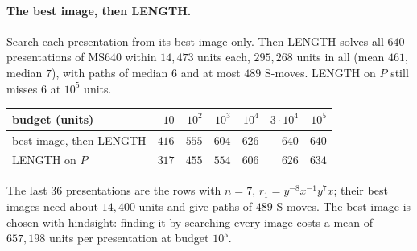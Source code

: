 \paragraph{The best image, then LENGTH.} Search each presentation from its best image only. Then LENGTH solves all
$640$ presentations of MS640 within $14{,}473$ units each, $295{,}268$ units in all (mean $461$, median $7$), with
paths of median $6$ and at most $489$ S-moves. LENGTH on $P$ still misses $6$ at $10^5$ units.
\begin{center}
\small
\begin{tabular}{lrrrrrr}
\toprule
budget (units) & $10$ & $10^2$ & $10^3$ & $10^4$ & $3\cdot10^4$ & $10^5$\\
\midrule
best image, then LENGTH & $416$ & $555$ & $604$ & $626$ & $640$ & $640$\\
LENGTH on $P$ & $317$ & $455$ & $554$ & $606$ & $626$ & $634$\\
\bottomrule
\end{tabular}
\end{center}
The last $36$ presentations are the rows with $n=7$, $r_1=y^{-8}x^{-1}y^{7}x$; their best images need about
$14{,}400$ units and give paths of $489$ S-moves. The best image is chosen with hindsight: finding it by searching every
image costs a mean of $657{,}198$ units per presentation at budget $10^5$.
\newline

\clearpage
